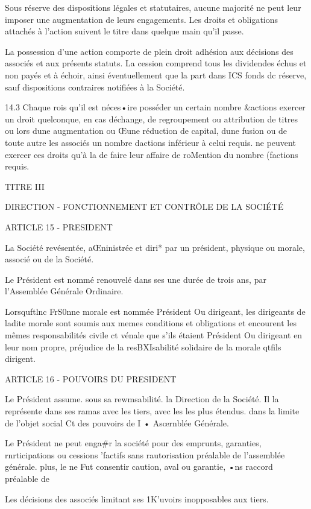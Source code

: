 \documentclass{article}
\begin{document}
Sous réserve des dispositions légales et statutaires, aucune majorité ne peut leur imposer une augmentation de leurs engagements. Les droits et obligations attachés à l'action suivent le titre dans quelque main qu'il passe.

La possession d'une action comporte de plein droit adhésion aux décisions des associés et aux présents statuts. La cession comprend tous les dividendes échus et non payés et à échoir, ainsi éventuellement que la part dans ICS fonds dc réserve, sauf dispositions contraires notifiées à la Société.

14.3 Chaque rois qu'il est néces•ire posséder un certain nombre &actions exercer un droit quelconque, en cas déchange, de regroupement ou attribution de titres ou lors dune augmentation ou Œune réduction de capital, dune fusion ou de toute autre les associés un nombre dactions inférieur à celui requis. ne peuvent exercer ces droits qu'à la de faire leur affaire de roMention du nombre (factions requis.

TITRE III

DIRECTION - FONCTIONNEMENT ET CONTRÔLE DE LA SOCIÉTÉ

ARTICLE 15 - PRESIDENT

La Société revésentée, aŒninistrée et diri* par un président, physique ou morale, associé ou de la Société.

Le Président est nommé renouvelé dans ses une durée de trois ans, par l'Assemblée Générale Ordinaire.

Lorsquftlnc FrS0nne morale est nommée Président Ou dirigeant, les dirigeants de ladite morale sont soumis aux memes conditions et obligations et encourent les mêmes responsabilités civile ct vénale que s'ils étaient Président Ou dirigeant en leur nom propre, préjudice de la resBXIsabilité solidaire de la morale qtfils dirigent.

ARTICLE 16 - POUVOIRS DU PRESIDENT

Le Président assume. sous sa rewmsabilité. la Direction de la Société. Il la représente dans ses ramas avec les tiers, avec les les plus étendus. dans la limite de l'objet social Ct des pouvoirs de I • Asœrnblée Générale.

Le Président ne peut enga#r la société pour des emprunts, garanties, rnrticipations ou cessions 'factifs sans rautorisation préalable de l'assemblée générale. plus, le ne Fut consentir caution, aval ou garantie, •ns raccord préalable de

Les décisions des associés limitant ses 1K'uvoirs inopposables aux tiers.
\end{document}
